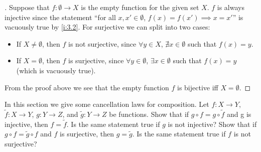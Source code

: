 \begin{proof}[]
  Suppose that \(f : \emptyset \to X\) is the empty function for the given set \(X\).
  \(f\) is always injective since the statement ``for all \(x, x' \in \emptyset\), \(f(x) = f(x') \implies x = x'\)'' is vacuously true by \cref{i:3.2}.
  For surjective we can split into two cases:
  \begin{itemize}
    \item If \(X \neq \emptyset\), then \(f\) is not surjective, since \(\forall y \in X\), \(\nexists x \in \emptyset\) such that \(f(x) = y\).
    \item If \(X = \emptyset\), then \(f\) is surjective, since \(\forall y \in \emptyset\), \(\exists x \in \emptyset\) such that \(f(x) = y\) (which is vacuously true).
  \end{itemize}
  From the proof above we see that the empty function \(f\) is bijective iff \(X = \emptyset\).
\end{proof}

\begin{ex}\label{i:ex:3.3.4}
  In this section we give some cancellation laws for composition.
  Let \(f : X \to Y\), \(\tilde{f} : X \to Y\), \(g : Y \to Z\), and \(\tilde{g} : Y \to Z\) be functions.
  Show that if \(g \circ f = g \circ \tilde{f}\) and g is injective, then \(f = \tilde{f}\).
  Is the same statement true if \(g\) is not injective?
  Show that if \(g \circ f = \tilde{g} \circ f\) and \(f\) is surjective, then \(g = \tilde{g}\).
  Is the same statement true if \(f\) is not surjective?
\end{ex}

